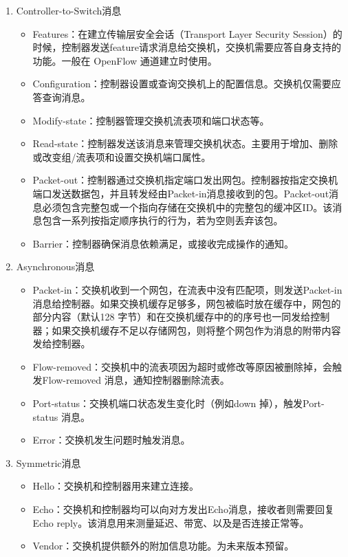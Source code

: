 \begin{enumerate}
\item Controller-to-Switch消息
\begin{itemize}
\item Features：在建立传输层安全会话（Transport Layer Security Session）的时候，控制器发送feature请求消息给交换机，交换机需要应答自身支持的功能。一般在 OpenFlow 通道建立时使用。
\item Configuration：控制器设置或查询交换机上的配置信息。交换机仅需要应答查询消息。
\item Modify-state：控制器管理交换机流表项和端口状态等。
\item Read-state：控制器发送该消息来管理交换机状态。主要用于增加、删除或改变组/流表项和设置交换机端口属性。
\item Packet-out：控制器通过交换机指定端口发出网包。控制器按指定交换机端口发送数据包，并且转发经由Packet-in消息接收到的包。Packet-out消息必须包含完整包或一个指向存储在交换机中的完整包的缓冲区ID。该消息包含一系列按指定顺序执行的行为，若为空则丢弃该包。 
\item Barrier：控制器确保消息依赖满足，或接收完成操作的通知。
\end{itemize}
\item Asynchronous消息
\begin{itemize}
\item Packet-in：交换机收到一个网包，在流表中没有匹配项，则发送Packet-in 消息给控制器。如果交换机缓存足够多，网包被临时放在缓存中，网包的部分内容（默认128 字节）和在交换机缓存中的的序号也一同发给控制器；如果交换机缓存不足以存储网包，则将整个网包作为消息的附带内容发给控制器。
\item Flow-removed：交换机中的流表项因为超时或修改等原因被删除掉，会触发Flow-removed 消息，通知控制器删除流表。
\item Port-status：交换机端口状态发生变化时（例如down 掉），触发Port-status 消息。
\item Error：交换机发生问题时触发消息。
\end{itemize}
\item Symmetric消息
\begin{itemize}
\item Hello：交换机和控制器用来建立连接。
\item Echo：交换机和控制器均可以向对方发出Echo消息，接收者则需要回复Echo reply。该消息用来测量延迟、带宽、以及是否连接正常等。
\item Vendor：交换机提供额外的附加信息功能。为未来版本预留。
\end{itemize}
\end{enumerate}

